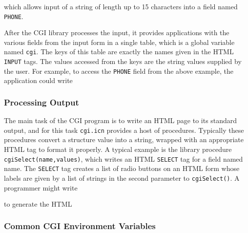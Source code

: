 {

\noindent
which allows input of a string of length up to 15 characters into a
field named \texttt{PHONE}.

After the CGI library processes the input, it provides applications with
the various fields from the input form in a single table, which is a
global variable named \texttt{cgi}. The keys of this table are exactly
the names given in the HTML \texttt{INPUT} tags. The values accessed
from the keys are the string values supplied by the user. For example,
to access the \texttt{PHONE} field from the above example, the
application could write 


\subsubsection{Processing Output}

The main task of the CGI program is to write an HTML page to its
standard output, and for this task \texttt{cgi.icn} provides a host of
procedures. Typically these procedures convert a structure value into a
string, wrapped with an appropriate HTML tag to format it properly. A
typical example is the library procedure
\texttt{cgiSelect(name,values)}, which writes an HTML \texttt{SELECT}
tag for a field named name. The \texttt{SELECT} tag creates a list of
radio buttons on an HTML form whose labels are given by a list of
strings in the second parameter to \texttt{cgiSelect()}. A programmer
might write


\noindent to generate the HTML


\subsubsection[Common CGI Environment Variables]{Common CGI Environment
Variables}

}
